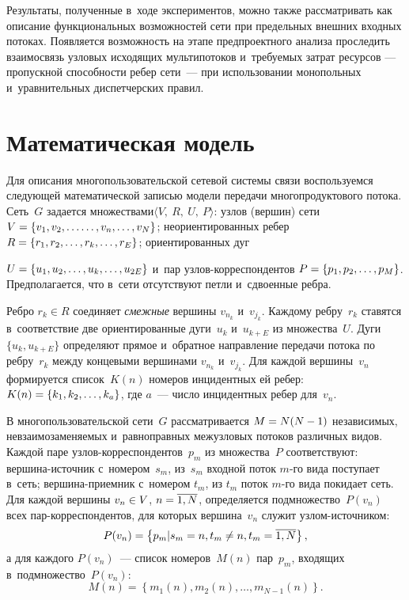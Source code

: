 \begin{multicols}{2}
Результаты, полученные в~ходе экспериментов,  можно также рассматривать как 
описание  функциональных возможностей сети при предельных внешних входных 
потоках. Появляется возможность  на этапе предпроектного анализа проследить  
взаимосвязь узловых исходящих мультипотоков и~требуемых затрат ресурсов --- 
пропускной способности ребер сети~--- при использовании монопольных и~уравнительных диспетчерских правил.

\vspace*{-9pt}

\section{Математическая модель}

\vspace*{-3pt}

Для описания многопользовательской сетевой системы связи  воспользуемся 
следующей математической записью модели передачи многопродуктового потока.
Сеть~$G$ задается множествами\linebreak  $\langle V,\ R, \ U,\ P \rangle$:
узлов (вершин) сети  $V \hm= \{ v_1, v_2, \ldots\linebreak \ldots, v_n, \ldots, v_N \}$;
неориентированных ребер $R \hm= \{ r_1, r_2, \ldots, r_k, \ldots, r_E \}$;
ориентированных дуг\linebreak\vspace*{-12pt}

\pagebreak

\noindent
  $U \hm= \{ u_1, u_2, \ldots, u_k, \ldots, u_{2E}\}$
и~пар уз\-лов-кор\-рес\-пон\-ден\-тов $P \hm= \{ p_1, p_2, \ldots, p_M\}$.
Предполагается, что в~сети отсутствуют петли и~сдвоенные ребра.


Ребро $r_k \in R$ соединяет \textit{смежные} вершины $v_{n_k}$ и~$v_{j_k}$.
Каждому ребру~$r_k$ ставятся в~соответствие две ориентированные дуги~$u_k$ 
и~$u_{k+E}$ из множества~$U$.\linebreak
Дуги $\{u_k, u_{k+E}\}$ определяют прямое и~обратное направ\-ле\-ние передачи потока 
по  ребру~$r_k$ между концевыми вершинами $v_{n_k}$ и~$v_{j_k}$. Для каждой 
вершины~$v_n$ формируется список~$K(n)$ номеров инцидентных ей ребер: $K(n) \hm= 
\{k_1, k_2, \ldots, k_a\}$, где $a$~--- число инцидентных ребер для~$v_n$.

В многопользовательской сети~$G$ рассматривается $M \hm= N (N\hm-1)$ независимых, 
невзаимозаменяемых и~равноправных межузловых потоков различных видов.
Каждой паре уз\-лов-кор\-рес\-пон\-ден\-тов~$p_m$ из множества~$P$ соответствуют:
вер\-ши\-на-ис\-точ\-ник с~номером~$s_m$,  из~$s_m$  входной поток $m$-го вида поступает в~сеть;
вер\-ши\-на-при\-ем\-ник с~номером ${t_m}$, из  ${t_m}$ поток $m$-го вида покидает сеть.
Для каждой вершины $v_n \hm\in V$, $n \hm= \ol {1, N}$, определяется подмножество~$P(v_n)$ 
всех пар-кор\-рес\-пон\-ден\-тов, для которых вершина~$v_n$ служит уз\-лом-ис\-точ\-ни\-ком:
$$
P(v_n) =\left \{ p_m | s_m = n, t_m \not = n, t_m = \overline{1, N} \right\},
$$
а для каждого $P(v_n)$~--- список номеров~$M(n)$ пар~$p_m$, входящих в~подмножество~$P(v_n)$:
$$
M(n) = \left\{m_1(n), m_2(n), \ldots , m_{N-1}(n)\right\}.
$$


\end{multicols}
